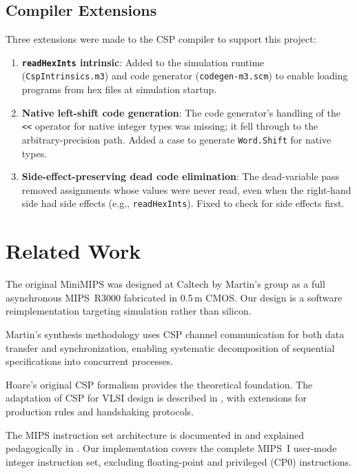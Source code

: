 \documentclass[11pt]{article}
\begin{document}
\subsection{Compiler Extensions}

Three extensions were made to the CSP compiler to support this project:

\begin{enumerate}
\item \textbf{\texttt{readHexInts} intrinsic}: Added to the simulation
  runtime (\texttt{CspIntrinsics.m3}) and code generator
  (\texttt{codegen-m3.scm}) to enable loading programs from hex files at
  simulation startup.

\item \textbf{Native left-shift code generation}: The code generator's
  handling of the \texttt{<<} operator for native integer types was missing;
  it fell through to the arbitrary-precision path.  Added a case to generate
  \texttt{Word.Shift} for native types.

\item \textbf{Side-effect-preserving dead code elimination}: The
  dead-variable pass removed assignments whose values were never read,
  even when the right-hand side had side effects (e.g.,
  \texttt{readHexInts}).  Fixed to check for side effects first.
\end{enumerate}

\section{Related Work}

The original MiniMIPS \cite{MiniMIPS2002,Lines1998} was designed at
Caltech by Martin's group as a full asynchronous MIPS~R3000 fabricated
in 0.5\,\textmu m CMOS\@.  Our design is a software reimplementation
targeting simulation rather than silicon.

Martin's synthesis methodology \cite{Martin1990,Martin2006,MartinSynthesis}
uses CSP channel communication for both data transfer and synchronization,
enabling systematic decomposition of sequential specifications into
concurrent processes.

Hoare's original CSP formalism \cite{Hoare1978,Hoare1985} provides the
theoretical foundation.  The adaptation of CSP for VLSI design is described in
\cite{Martin1990}, with extensions for production rules and handshaking
protocols.

The MIPS instruction set architecture is documented in \cite{MIPSR3000} and
explained pedagogically in \cite{Patterson2014}.  Our implementation covers
the complete MIPS~I user-mode integer instruction set, excluding floating-point
and privileged (CP0) instructions.
\end{document}
